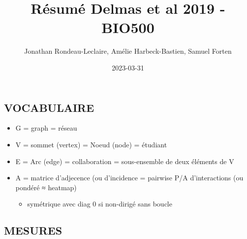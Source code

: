 \documentclass[
]{article}
\title{Résumé Delmas et al 2019 - BIO500}
\author{Jonathan Rondeau-Leclaire, Amélie Harbeck-Bastien, Samuel
Forten}
\date{2023-03-31}
\providecommand{\tightlist}{%
  \setlength{\itemsep}{0pt}\setlength{\parskip}{0pt}}
\begin{document}
\maketitle

\hypertarget{vocabulaire}{%
\subsection{VOCABULAIRE}\label{vocabulaire}}

\begin{itemize}
\tightlist
\item
  G = graph = réseau
\item
  V = sommet (vertex) = Noeud (node) = étudiant
\item
  E = Arc (edge) = collaboration = sous-ensemble de deux éléments de V
\item
  A = matrice d'adjecence (ou d'incidence = pairwise P/A d'interactions
  (ou pondéré ≈ heatmap)

  \begin{itemize}
  \tightlist
  \item
    symétrique avec diag 0 si non-dirigé sans boucle
  \end{itemize}
\end{itemize}

\hypertarget{mesures}{%
\subsection{MESURES}\label{mesures}}
\end{document}
